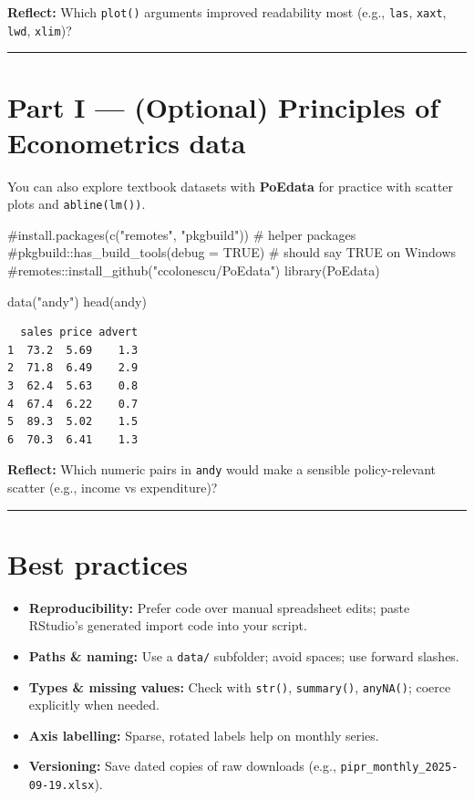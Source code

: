 \documentclass[
  letterpaper,
  DIV=11,
  numbers=noendperiod]{scrreprt}
\newenvironment{Shaded}{\begin{snugshade}}{\end{snugshade}}
\newcommand{\CommentTok}[1]{\textcolor[rgb]{0.37,0.37,0.37}{#1}}
\newcommand{\FunctionTok}[1]{\textcolor[rgb]{0.28,0.35,0.67}{#1}}
\newcommand{\NormalTok}[1]{\textcolor[rgb]{0.00,0.23,0.31}{#1}}
\newcommand{\StringTok}[1]{\textcolor[rgb]{0.13,0.47,0.30}{#1}}
\providecommand{\tightlist}{%
  \setlength{\itemsep}{0pt}\setlength{\parskip}{0pt}}
\begin{document}
\textbf{Reflect:} Which \texttt{plot()} arguments improved readability
most (e.g., \texttt{las}, \texttt{xaxt}, \texttt{lwd}, \texttt{xlim})?

\begin{center}\rule{0.5\linewidth}{0.5pt}\end{center}

\section{Part I --- (Optional) Principles of Econometrics
data}\label{part-i-optional-principles-of-econometrics-data}

You can also explore textbook datasets with \textbf{PoEdata} for
practice with scatter plots and \texttt{abline(lm())}.

\begin{Shaded}
\begin{Highlighting}[]
\CommentTok{\#install.packages(c("remotes", "pkgbuild"))   \# helper packages}
\CommentTok{\#pkgbuild::has\_build\_tools(debug = TRUE)       \# should say TRUE on Windows}
\CommentTok{\#remotes::install\_github("ccolonescu/PoEdata")}
\FunctionTok{library}\NormalTok{(PoEdata)}

\FunctionTok{data}\NormalTok{(}\StringTok{"andy"}\NormalTok{)}
\FunctionTok{head}\NormalTok{(andy)}
\end{Highlighting}
\end{Shaded}

\begin{verbatim}
  sales price advert
1  73.2  5.69    1.3
2  71.8  6.49    2.9
3  62.4  5.63    0.8
4  67.4  6.22    0.7
5  89.3  5.02    1.5
6  70.3  6.41    1.3
\end{verbatim}

\textbf{Reflect:} Which numeric pairs in \texttt{andy} would make a
sensible policy-relevant scatter (e.g., income vs expenditure)?

\begin{center}\rule{0.5\linewidth}{0.5pt}\end{center}

\section{Best practices}\label{best-practices-2}

\begin{itemize}
\tightlist
\item
  \textbf{Reproducibility:} Prefer code over manual spreadsheet edits;
  paste RStudio's generated import code into your script.
\item
  \textbf{Paths \& naming:} Use a \texttt{data/} subfolder; avoid
  spaces; use forward slashes.
\item
  \textbf{Types \& missing values:} Check with \texttt{str()},
  \texttt{summary()}, \texttt{anyNA()}; coerce explicitly when needed.
\item
  \textbf{Axis labelling:} Sparse, rotated labels help on monthly
  series.
\item
  \textbf{Versioning:} Save dated copies of raw downloads (e.g.,
  \texttt{pipr\_monthly\_2025-09-19.xlsx}).
\end{itemize}
\end{document}
